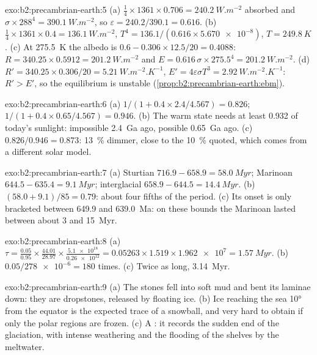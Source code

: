 \begin{solution}{exo:b2:precambrian-earth:5}
(a) $\tfrac14\times1361\times0.706 = \qty{240.2}{W.m^{-2}}$ absorbed and $\sigma\times288^4 =
\qty{390.1}{W.m^{-2}}$, so $\varepsilon = 240.2/390.1 = 0.616$. (b) $\tfrac14\times1361\times0.4
= \qty{136.1}{W.m^{-2}}$, $T^4 = 136.1/(0.616\times\num{5.670e-8})$, $T = \qty{249.8}{K}$.
(c) At \qty{275.5}{K} the albedo is $0.6 - 0.306\times12.5/20 = 0.4088$: $R = 340.25\times0.5912 =
\qty{201.2}{W.m^{-2}}$ and $E = 0.616\,\sigma\times275.5^4 = \qty{201.2}{W.m^{-2}}$. (d) $R' =
340.25\times0.306/20 = \qty{5.21}{W.m^{-2}.K^{-1}}$, $E' = 4\varepsilon\sigma T^3 =
\qty{2.92}{W.m^{-2}.K^{-1}}$: $R' > E'$, so the equilibrium is unstable
(\cref{prop:b2:precambrian-earth:ebm}).
\end{solution}

\begin{solution}{exo:b2:precambrian-earth:6}
(a) $1/(1 + 0.4\times2.4/4.567) = 0.826$; $1/(1 + 0.4\times0.65/4.567) = 0.946$. (b) The warm
state needs at least 0.932 of today's sunlight: impossible \qty{2.4}{Ga} ago, possible
\qty{0.65}{Ga} ago. (c) $0.826/0.946 = 0.873$: \qty{13}{\percent} dimmer, close to the
\qty{10}{\percent} quoted, which comes from a different solar model.
\end{solution}

\begin{solution}{exo:b2:precambrian-earth:7}
(a) Sturtian $716.9 - 658.9 = \qty{58.0}{Myr}$; Marinoan $644.5 - 635.4 = \qty{9.1}{Myr}$;
interglacial $658.9 - 644.5 = \qty{14.4}{Myr}$. (b) $(58.0 + 9.1)/85 = 0.79$: about four fifths
of the period. (c) Its onset is only bracketed between 649.9 and \qty{639.0}{Ma}: on these
bounds the Marinoan lasted between about 3 and \qty{15}{Myr}.
\end{solution}

\begin{solution}{exo:b2:precambrian-earth:8}
(a) $\tau = \frac{0.05}{0.95}\times\frac{44.01}{28.97}\times\frac{\num{5.1e18}}{\num{0.26e12}} =
0.05263\times1.519\times\num{1.962e7} = \qty{1.57}{Myr}$. (b) $0.05/\num{278e-6} = 180$ times.
(c) Twice as long, \qty{3.14}{Myr}.
\end{solution}

\begin{solution}{exo:b2:precambrian-earth:9}
(a) The stones fell into soft mud and bent its laminae down: they are dropstones, released by
floating ice. (b) Ice reaching the sea \ang{10} from the equator is the expected trace of a
snowball, and very hard to obtain if only the polar regions are frozen. (c) A :
it records the sudden end of the glaciation, with intense weathering and the flooding of the
shelves by the meltwater.
\end{solution}

